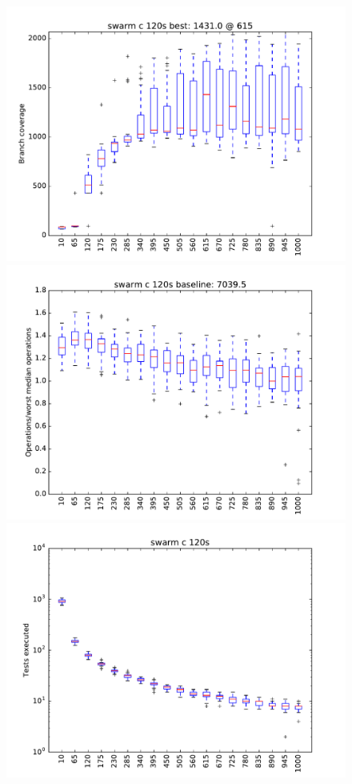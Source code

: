 \begin{figure}
\includegraphics[width=\columnwidth]{graphs/Cswarm120}
\includegraphics[width=\columnwidth]{graphs/opsCswarm120}
\includegraphics[width=\columnwidth]{graphs/execCswarm120}
\end{figure}


